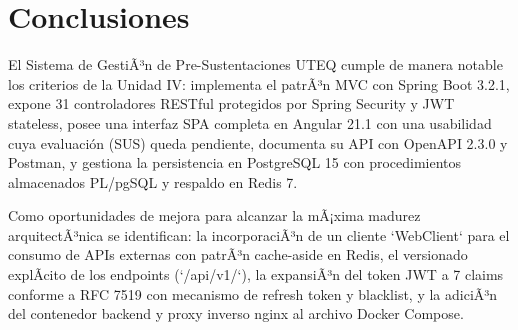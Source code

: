 \section{Conclusiones}
El Sistema de GestiÃ³n de Pre-Sustentaciones UTEQ cumple de manera notable los criterios de la Unidad IV: implementa
el patrÃ³n MVC con Spring Boot 3.2.1, expone 31 controladores RESTful protegidos por Spring Security y JWT stateless,
posee una interfaz SPA completa en Angular 21.1 con una usabilidad cuya evaluación (SUS) queda pendiente, documenta
su API con OpenAPI 2.3.0 y Postman, y gestiona la persistencia en PostgreSQL 15 con procedimientos almacenados PL/pgSQL
y respaldo en Redis 7.

Como oportunidades de mejora para alcanzar la mÃ¡xima madurez arquitectÃ³nica se identifican: la incorporaciÃ³n de
un cliente `WebClient` para el consumo de APIs externas con patrÃ³n cache-aside en Redis, el versionado explÃ­cito de
los endpoints (`/api/v1/`), la expansiÃ³n del token JWT a 7 claims conforme a RFC 7519 con mecanismo de refresh token y
blacklist, y la adiciÃ³n del contenedor backend y proxy inverso nginx al archivo Docker Compose.

